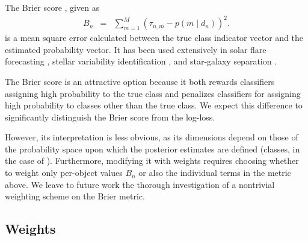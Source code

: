 The Brier score \citep{brier_verification_1950}, given as
\begin{eqnarray}
  \label{eq:brier}
B_{n} &=& \sum_{m=1}^{M}(\tau_{n, m}-p(m \mid d_{n}))^{2}.
\end{eqnarray}
is a mean square error calculated between the true class indicator vector and the estimated probability vector.
It has been used extensively in solar flare forecasting \citep{crown_validation, mays_ensemble_2015, florios_forecasting_2018}, stellar variability identification \citep{richards_construction_2012, armstrong_k2_2016}, and star-galaxy separation \citep{kim_hybrid_2015}.

The Brier score is an attractive option because it both rewards classifiers assigning high probability to the true class and penalizes classifiers for assigning high probability to classes other than the true class.
We expect this difference to significantly distinguish the Brier score from the log-loss.

However, its interpretation is less obvious, as its dimensions depend on those of the probability space upon which the posterior estimates are defined (classes, in the case of \plasticc).
Furthermore, modifying it with weights requires choosing whether to weight only per-object values $B_{n}$ or also the individual terms in the metric above.
We leave to future work the thorough investigation of a nontrivial weighting scheme on the Brier metric.


%

\subsection{Weights}
\label{sec:weights}


